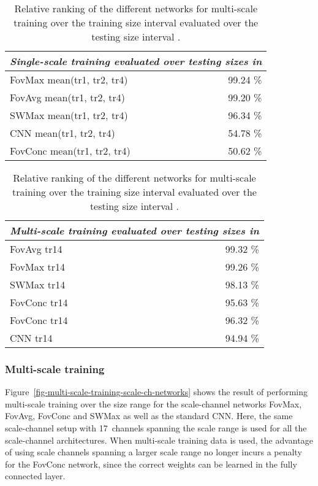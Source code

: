 \documentclass[twocolumn,runningheads]{svjour3}
\begin{document}
\begin{table}[hbtp]
  \begin{tabular}{lr}
  \hline
  \multicolumn{2}{c}{\em Single-scale training evaluated over testing sizes in } \\
    \hline
    FovMax mean(tr1, tr2, tr4) & 99.24 \% \\
    FovAvg mean(tr1, tr2, tr4) & 99.20 \% \\
    SWMax mean(tr1, tr2, tr4) & 96.34 \% \\
    CNN mean(tr1, tr2, tr4)  & 54.78 \% \\
    FovConc mean(tr1, tr2, tr4) & 50.62 \% \\
    \hline
    \end{tabular}
 \caption{Relative ranking of the different networks for single-scale
   training at either of the training sizes 1, 2 or~4 evaluated over the testing size interval .}
 \label{tab-benchmark-single-scale-training-1/2-4}

 \bigskip
 \bigskip
 
  \begin{tabular}{lr}
  \hline
  \multicolumn{2}{c}{\em Multi-scale training evaluated over testing sizes in } \\
    \hline
    FovAvg tr14 & 99.32 \% \\
    FovMax tr14 & 99.26 \% \\
    SWMax tr14 & 98.13 \% \\
    FovConc tr14 & 95.63 \% \\
    FovConc tr14 & 96.32 \% \\
    CNN tr14 & 94.94 \% \\
    \hline
    \end{tabular}
 \caption{Relative ranking of the different networks for multi-scale
   training over the training size interval  evaluated over the testing size interval .}
  \label{tab-benchmark-multi-scale-training-1/2-4}
\end{table}

\subsubsection{Multi-scale training}

Figure~\ref{fig-multi-scale-training-scale-ch-networks} shows the
result of performing multi-scale training over the size range 
for the scale-channel networks FovMax, FovAvg, FovConc and SWMax as well as the standard CNN.
Here, the same scale-channel setup with 17~channels
spanning the scale range  is used for all the scale-channel
architectures. When multi-scale training data is used, the advantage of using scale channels spanning a larger scale range no longer incurs a penalty for the FovConc network, since the correct weights can be learned in the fully connected layer. 
\end{document}
